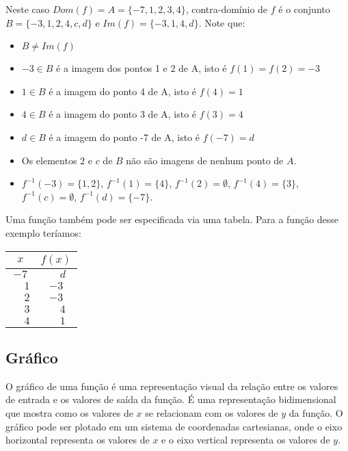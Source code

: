 \documentclass[12pt]{article}
\begin{document}
Neste caso $Dom(f) = A = \{-7, 1, 2, 3, 4\}$, contra-domínio de $f$ é o conjunto $B = \{-3, 1, 2, 4, c, d\}$ e $Im(f) = \{-3, 1, 4, d\}$. Note que:
\begin{itemize}
    \item $B \neq Im(f)$
    \item $-3 \in B$ é a imagem dos pontos 1 e 2 de A, isto é $f(1) = f(2) = -3$
    \item $1 \in B$ é a imagem do ponto 4 de A, isto é $f(4) = 1$
    \item $4 \in B$ é a imagem do ponto 3 de A, isto é $f(3) = 4$
    \item $d \in B$ é a imagem do ponto -7 de A, isto é $f(-7) = d$
    \item Os elementos $2$ e $c$ de $B$ não são imagens de nenhum ponto de $A$.
    \item $f^{-1}(-3) = \{1, 2\}$, $f^{-1}(1) = \{4\}$, $f^{-1}(2) = \emptyset$, $f^{-1}(4) = \{3\}$, $f^{-1}(c) = \emptyset$, $f^{-1}(d) = \{-7\}$.
\end{itemize}

Uma função também pode ser especificada via uma tabela. Para a função desse exemplo teríamos:
\\
\begin{center}
    \begin{tabular}{|c|c|}
        \hline
        $x$             &          $f(x)$ \\
        \hline
                  $-7$  &  $\phantom{-}d$ \\
        $\phantom{-}1$  &            $-3$ \\
        $\phantom{-}2$  &            $-3$ \\
        $\phantom{-}3$  &  $\phantom{-}4$ \\
        $\phantom{-}4$  &  $\phantom{-}1$ \\
        \hline
    \end{tabular}
\end{center}

\subsection{Gráfico}

O gráfico de uma função é uma representação visual da relação entre os valores de entrada e os valores de saída da função. É uma representação bidimensional que mostra como os valores de $x$ se relacionam com os valores de $y$ da função.
O gráfico pode ser plotado em um sistema de coordenadas cartesianas, onde o eixo horizontal representa os valores de $x$ e o eixo vertical representa os valores de $y$.
\end{document}
